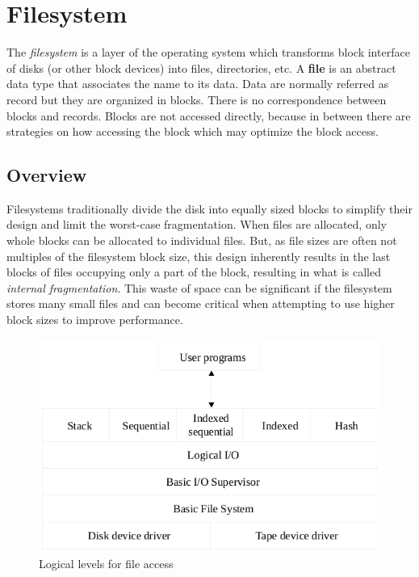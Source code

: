 \chapter{Filesystem}
The \emph{filesystem} is a layer of the operating system which transforms block interface of disks (or other block devices) into files, directories, etc.
A \textbf{file} is an abstract data type that associates the name to its data. Data are normally referred as record but they are organized in blocks. There is no correspondence between blocks and records. Blocks are not accessed directly, because in between there are strategies on how accessing the block which may optimize the block access.

\section{Overview}
Filesystems traditionally divide the disk into equally sized blocks to simplify their design and limit the worst-case fragmentation. When files are allocated, only whole blocks can be allocated to individual files. But, as file sizes are often not multiples of the filesystem block size, this design inherently results in the last blocks of files  occupying only a part of the block, resulting in what is called \emph{internal fragmentation}. This waste of space can be significant if the filesystem stores many small files and can become critical when attempting to use higher block sizes to improve performance.

\begin{figure}[hbtp]
\centering
\includegraphics[scale=0.4]{images/file_system/logical_level_file_access.png}
\caption{Logical levels for file access}
\end{figure}

